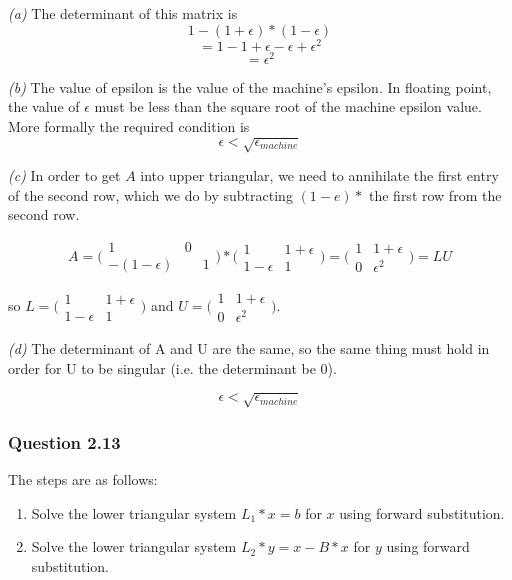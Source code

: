 \documentclass{article}
\begin{document}
\textit{(a)}
The determinant of this matrix is
$$1 - (1 + \epsilon) * (1 - \epsilon)$$
$$= 1 - 1 + \epsilon - \epsilon + \epsilon^2$$
$$ = \epsilon^2$$

\textit{(b)}
The value of epsilon is the value of the machine's epsilon.
In floating point, the value of $\epsilon$ must be less than
the square root of the machine epsilon value. More formally the
required condition is
$$\epsilon < \sqrt{\epsilon_{machine}}$$

\textit{(c)}
In order to get $A$ into upper triangular, we need to annihilate the first
entry of the second row, which we do by subtracting $(1-e) *$ the first row
from the second row.

$$A = \bigl( \begin{smallmatrix}
		   1 & 0\\
    	   -(1 - \epsilon) && 1
           \end{smallmatrix} \bigr)
           * \bigl( \begin{smallmatrix} 
			  1 & 1 + \epsilon\\
  			  1 - \epsilon & 1 
			\end{smallmatrix} \bigr)
		= \bigl( \begin{smallmatrix} 
			  1 & 1 + \epsilon\\
  			  0 & \epsilon^2 
			\end{smallmatrix} \bigr) = LU$$
			
so $L =\bigl( \begin{smallmatrix} 
			  1 & 1 + \epsilon\\
  			  1 - \epsilon & 1 
			\end{smallmatrix} \bigr)$
and $U = \bigl( \begin{smallmatrix} 
			  1 & 1 + \epsilon\\
  			  0 & \epsilon^2 
			\end{smallmatrix} \bigr).$
			
\textit{(d)}
The determinant of A and U are the same, so the same thing must hold
in order for U to be singular (i.e. the determinant be 0).

$$\epsilon < \sqrt{\epsilon_{machine}}$$

\subsubsection{Question 2.13}
The steps are as follows:
\begin{enumerate}
\item Solve the lower triangular system $L_1 * x = b$ for $x$ using forward substitution.
\item Solve the lower triangular system $L_2 * y = x - B* x$ for $y$ using forward substitution.
\end{enumerate}
\end{document}
